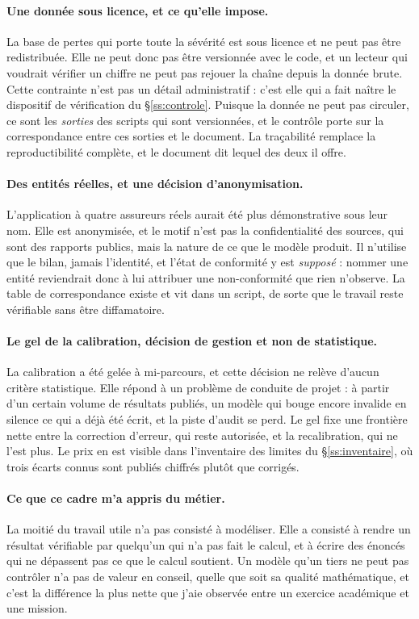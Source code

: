 \documentclass[12pt,a4paper]{article}
\theoremstyle{definition}
\begin{document}
\paragraph{Une donnée sous licence, et ce qu'elle impose.} La base de pertes qui
porte toute la sévérité est sous licence et ne peut pas être redistribuée. Elle ne
peut donc pas être versionnée avec le code, et un lecteur qui voudrait vérifier un
chiffre ne peut pas rejouer la chaîne depuis la donnée brute. Cette contrainte
n'est pas un détail administratif : c'est elle qui a fait naître le dispositif de
vérification du \S\ref{ss:controle}. Puisque la donnée ne peut pas circuler, ce
sont les \emph{sorties} des scripts qui sont versionnées, et le contrôle porte sur
la correspondance entre ces sorties et le document. La traçabilité remplace la
reproductibilité complète, et le document dit lequel des deux il offre.

\paragraph{Des entités réelles, et une décision d'anonymisation.} L'application à
quatre assureurs réels aurait été plus démonstrative sous leur nom. Elle est
anonymisée, et le motif n'est pas la confidentialité des sources, qui sont des
rapports publics, mais la nature de ce que le modèle produit. Il n'utilise que le
bilan, jamais l'identité, et l'état de conformité y est \emph{supposé} : nommer une
entité reviendrait donc à lui attribuer une non-conformité que rien n'observe. La
table de correspondance existe et vit dans un script, de sorte que le travail reste
vérifiable sans être diffamatoire.

\paragraph{Le gel de la calibration, décision de gestion et non de statistique.}
La calibration a été gelée à mi-parcours, et cette décision ne relève d'aucun
critère statistique. Elle répond à un problème de conduite de projet : à partir
d'un certain volume de résultats publiés, un modèle qui bouge encore invalide en
silence ce qui a déjà été écrit, et la piste d'audit se perd. Le gel fixe une
frontière nette entre la correction d'erreur, qui reste autorisée, et la
recalibration, qui ne l'est plus. Le prix en est visible dans l'inventaire des
limites du \S\ref{ss:inventaire}, où trois écarts connus sont publiés chiffrés
plutôt que corrigés.

\paragraph{Ce que ce cadre m'a appris du métier.} La moitié du travail utile n'a
pas consisté à modéliser. Elle a consisté à rendre un résultat vérifiable par
quelqu'un qui n'a pas fait le calcul, et à écrire des énoncés qui ne dépassent pas
ce que le calcul soutient. Un modèle qu'un tiers ne peut pas contrôler n'a pas de
valeur en conseil, quelle que soit sa qualité mathématique, et c'est la différence
la plus nette que j'aie observée entre un exercice académique et une mission.
\end{document}
